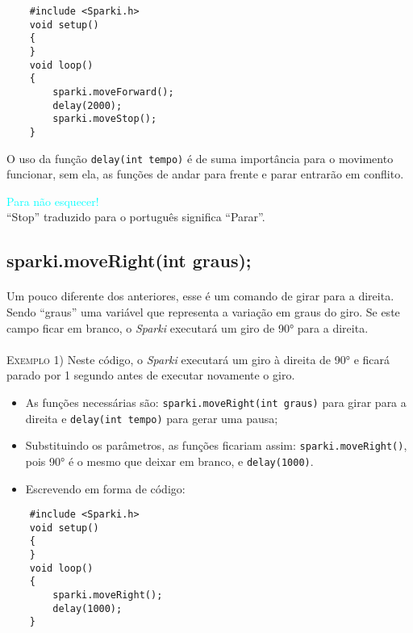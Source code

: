     \begin{verbatim}
    #include <Sparki.h>
    void setup()
    {
    }
    void loop()
    {
        sparki.moveForward();
        delay(2000);
        sparki.moveStop();
    }
    \end{verbatim}
    
    O uso da função \texttt{delay(int tempo)} é de suma importância para o movimento funcionar, sem ela, as funções de andar para frente e parar entrarão em conflito.
    
    \begin{center}
    \textcolor{cyan}{Para não esquecer!}
    \\``Stop'' traduzido para o português significa ``Parar''.
    \end{center}
    
\subsection{sparki.moveRight(int graus);}
    \paragraph{}
    Um pouco diferente dos anteriores, esse é um comando de girar para a direita. Sendo ``graus'' uma variável que representa a variação em graus do giro. Se este campo ficar em branco, o \textsl{Sparki} executará um giro de 90° para a direita.
    \\~\\
    
    \textsc{Exemplo 1)} Neste código, o \textsl{Sparki} executará um giro à direita de 90° e ficará parado por 1 segundo antes de executar novamente o giro.
    
    \begin{itemize}
        \item As funções necessárias são: \texttt{sparki.moveRight(int graus)} para girar para a direita e \texttt{delay(int tempo)} para gerar uma pausa;
        \item Substituindo os parâmetros, as funções ficariam assim: \texttt{sparki.moveRight()}, pois 90° é o mesmo que deixar em branco, e \texttt{delay(1000)}.
        \item Escrevendo em forma de código:
    \end{itemize}
    
    \begin{verbatim}
    #include <Sparki.h>
    void setup()
    {
    }
    void loop()
    {
        sparki.moveRight();
        delay(1000);
    }
    \end{verbatim}
    
